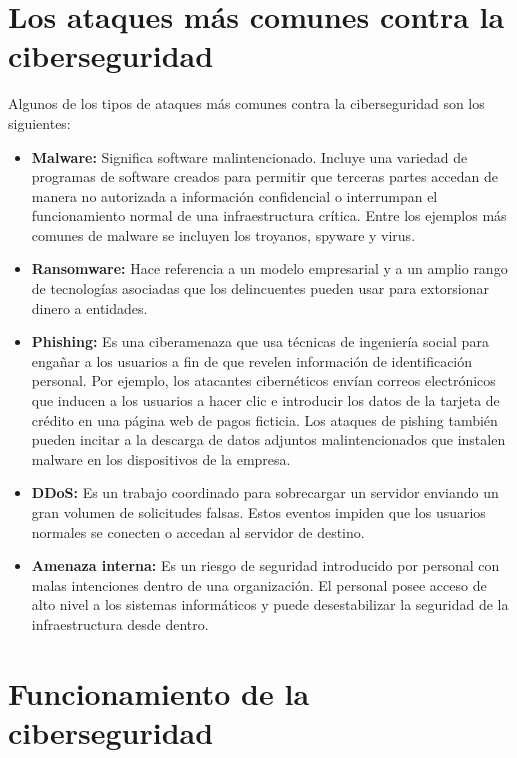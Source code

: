 \documentclass[11pt]{report}
\begin{document}
\section{Los ataques más comunes contra la ciberseguridad}
Algunos de los tipos de ataques más comunes contra la ciberseguridad son los siguientes:
\begin{itemize}
  \item \textbf{Malware:} Significa software malintencionado. Incluye una variedad de programas de software creados para permitir que terceras partes accedan de manera no autorizada a información confidencial o interrumpan el funcionamiento normal de una infraestructura crítica. Entre los ejemplos más comunes de malware se incluyen los troyanos, spyware y virus.

  \item \textbf{Ransomware:} Hace referencia a un modelo empresarial y a un amplio rango de tecnologías asociadas que los delincuentes pueden usar para extorsionar dinero a entidades.
  
  \cleardoublepage

  \item \textbf{Phishing: } Es una ciberamenaza que usa técnicas de ingeniería social para engañar a los usuarios a fin de que revelen información de identificación personal. Por ejemplo, los atacantes cibernéticos envían correos electrónicos que inducen a los usuarios a hacer clic e introducir los datos de la tarjeta de crédito en una página web de pagos ficticia. 
  Los ataques de pishing también pueden incitar a la descarga de datos adjuntos malintencionados que instalen malware en los dispositivos de la empresa.

  \item \textbf{DDoS: } Es un trabajo coordinado para sobrecargar un servidor enviando un gran volumen de solicitudes falsas. Estos eventos impiden que los usuarios normales se conecten o accedan al servidor de destino. 
  
  \item \textbf{Amenaza interna: } Es un riesgo de seguridad introducido por personal con malas intenciones dentro de una organización. El personal posee acceso de alto nivel a los sistemas informáticos y puede desestabilizar la seguridad de la infraestructura desde dentro. 
\end{itemize}

\section{Funcionamiento de la ciberseguridad}
\end{document}
